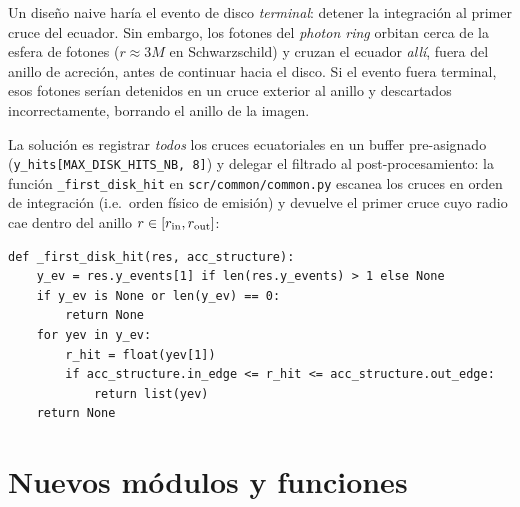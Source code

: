 \documentclass[11pt,a4paper]{article}
\begin{document}
Un diseño naive haría el evento de disco \emph{terminal}: detener
la integración al primer cruce del ecuador. Sin embargo, los fotones
del \emph{photon ring} orbitan cerca de la esfera de fotones
($r \approx 3M$ en Schwarzschild) y cruzan el ecuador \emph{allí},
fuera del anillo de acreción, antes de continuar hacia el disco.
Si el evento fuera terminal, esos fotones serían detenidos en un
cruce exterior al anillo y descartados incorrectamente, borrando el
anillo de la imagen.

La solución es registrar \emph{todos} los cruces ecuatoriales en un
buffer pre-asignado (\texttt{y\_hits[MAX\_DISK\_HITS\_NB, 8]}) y
delegar el filtrado al post-procesamiento: la función
\texttt{\_first\_disk\_hit} en \texttt{scr/common/common.py} escanea
los cruces en orden de integración (i.e.\ orden físico de emisión) y
devuelve el primer cruce cuyo radio cae dentro del anillo
$r \in [r_{\rm in}, r_{\rm out}]$:

\begin{lstlisting}[style=py, caption={Selección del primer cruce dentro del anillo.}]
def _first_disk_hit(res, acc_structure):
    y_ev = res.y_events[1] if len(res.y_events) > 1 else None
    if y_ev is None or len(y_ev) == 0:
        return None
    for yev in y_ev:
        r_hit = float(yev[1])
        if acc_structure.in_edge <= r_hit <= acc_structure.out_edge:
            return list(yev)
    return None
\end{lstlisting}

\section{Nuevos módulos y funciones}
\end{document}
